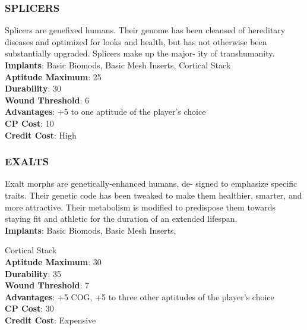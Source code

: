 \subsubsection{SPLICERS}
Splicers are genefixed humans. Their genome has
been cleansed of hereditary diseases and optimized
for looks and health, but has not otherwise been
substantially upgraded. Splicers make up the major-
ity of transhumanity.
\\ \textbf{Implants}: Basic Biomods, Basic Mesh Inserts,
Cortical Stack
\\ \textbf{Aptitude Maximum}: 25
\\ \textbf{Durability}: 30
\\ \textbf{Wound Threshold}: 6
\\ \textbf{Advantages}: +5 to one aptitude of the player’s choice
\\ \textbf{CP Cost}: 10
\\ \textbf{Credit Cost}: High

\subsubsection{EXALTS}
Exalt morphs are genetically-enhanced humans, de-
signed to emphasize specific traits. Their genetic code
has been tweaked to make them healthier, smarter,
and more attractive. Their metabolism is modified to
predispose them towards staying fit and athletic for
the duration of an extended lifespan.
\\ \textbf{Implants}: Basic Biomods, Basic Mesh Inserts,

Cortical Stack
\\ \textbf{Aptitude Maximum}: 30
\\ \textbf{Durability}: 35
\\ \textbf{Wound Threshold}: 7
\\ \textbf{Advantages}: +5 COG, +5 to three other aptitudes of
the player’s choice
\\ \textbf{CP Cost}: 30
\\ \textbf{Credit Cost}: Expensive

